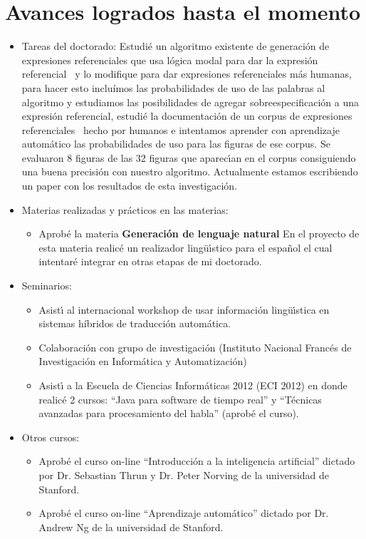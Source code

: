 \section{Avances logrados hasta el momento}
\label{progreso}

\begin{itemize}
\item Tareas del doctorado:
Estudi\'e un algoritmo existente de generaci\'on de expresiones referenciales que usa l\'ogica modal para dar la 
expresi\'on referencial~\cite{Areces2008} y lo modifique para dar expresiones referenciales m\'as humanas, para hacer 
esto inclu\'imos las probabilidades de uso de las palabras al algoritmo y estudiamos las posibilidades de agregar 
sobreespecificaci\'on a una expresi\'on referencial, estudi\'e la documentaci\'on de un corpus de expresiones 
referenciales~\cite{viethen-dale:2011:UCNLG+Eval} hecho por humanos e intentamos aprender con aprendizaje autom\'atico 
las probabilidades de uso para las figuras de ese corpus. Se evaluaron 8 figuras de las 32 figuras que aparec\'{\i}an en 
el corpus consiguiendo una buena precisi\'on con nuestro algoritmo. Actualmente estamos escribiendo un paper con los resultados de esta investigaci\'on.

\item Materias realizadas y pr\'acticos en las materias:
\begin{itemize}
\item Aprob\'e la materia {\bf Generaci\'on de lenguaje natural} En el proyecto de esta materia realic\'e un realizador 
ling\"u\'{\i}stico para el espa\~{n}ol el cual intentar\'e integrar en otras etapas de mi doctorado.
\end{itemize}
\item Seminarios:
\begin{itemize}
\item Asist\'{\i} al internacional workshop de usar informaci\'on ling\"u\'{\i}stica en sistemas h\'{i}bridos de traducci\'on autom\'atica.
\item Colaboraci\'on con grupo de investigaci\'on (Instituto Nacional Franc\'es de Investigaci\'on en Inform\'atica y Automatizaci\'on)
\item Asist\'{\i} a la Escuela de Ciencias Inform\'aticas 2012 (ECI 2012) en donde realic\'e 2 cursos: ``Java para software de tiempo real'' 
y ``T\'ecnicas avanzadas para procesamiento del habla'' (aprob\'e el curso).
\end{itemize}
\item Otros cursos:
\begin{itemize}
\item Aprob\'e el curso on-line ``Introducci\'on a la inteligencia artificial'' dictado por Dr. Sebastian Thrun y Dr. Peter Norving de la 
universidad de Stanford.
\item Aprob\'e el curso on-line ``Aprendizaje autom\'atico'' dictado por Dr. Andrew Ng de la universidad de Stanford. 
\end{itemize}

\end{itemize}




